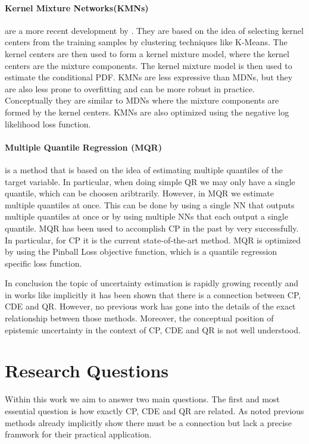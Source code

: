 \paragraph{Kernel Mixture Networks(KMNs)} are a more recent development by \cite{ambrogioni2017kernel}. They are based on the idea of selecting kernel centers from the training samples by clustering techniques like K-Means. The kernel centers are then used to form a kernel mixture model, where the kernel centers are the mixture components. The kernel mixture model is then used to estimate the conditional PDF. KMNs are less expressive than MDNs, but they are also less prone to overfitting and can be more robust in practice. Conceptually they are similar to MDNs where the mixture components are formed by the kernel centers. KMNs are also optimized using the negative log likelihood loss function.

\paragraph{Multiple Quantile Regression (MQR)} is a method that is based on the idea of estimating multiple quantiles of the target variable. In particular, when doing simple QR we may only have a single quantile, which can be choosen aribtrarily. However, in MQR we estimate multiple quantiles at once. This can be done by using a single NN that outputs multiple quantiles at once or by using multiple NNs that each output a single quantile. MQR has been used to accomplish CP in the past by \cite{sesia2021conformal} very successfully. In particular, for CP it is the current state-of-the-art method. MQR is optimized by using the Pinball Loss objective function, which is a quantile regression specific loss function.

In conclusion the topic of uncertainty estimation is rapidly growing recently and in works like \cite{chernozhukov2021distributional} implicitly it has been shown that there is a connection between CP, CDE and QR. However, no previous work has gone into the details of the exact relationship between those methods. Moreover, the conceptual position of epistemic uncertainty in the context of CP, CDE and QR is not well understood.

\section{Research Questions}\label{sec:questions}

Within this work we aim to answer two main questions. The first and most essential question is how exactly CP, CDE and QR are related. As noted previous methods already implicitly show there must be a connection \cite{sesia2021conformal,chernozhukov2021distributional,chung2020beyond} but lack a precise framwork for their practical application.

